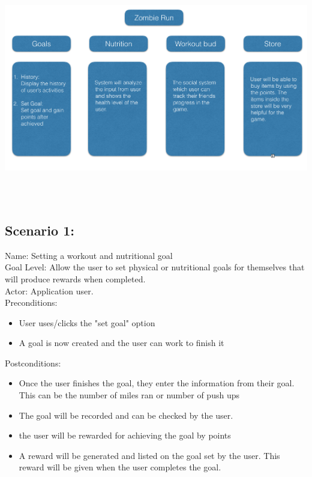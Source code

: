 \documentclass[a4paper]{article}
\begin{document}
\graphicspath{ {files/graph.png} }
\includegraphics[width = 15cm, height=10cm]{graph}

\subsection{Scenario 1:}
Name: Setting a workout and nutritional goal\newline
\\
Goal Level: Allow the user to set physical  or nutritional goals for themselves that will produce rewards when completed.\newline
\\
Actor: Application user.\newline
\\
Preconditions:
\begin{itemize}
\item User uses/clicks the "set goal" option
\item A goal is now created and the user can work to finish it
\end{itemize}
Postconditions:
\begin{itemize}
\item Once the user finishes the goal, they enter the information from their goal. This can be the number of miles ran or number of push ups
\item The goal will be recorded and can be checked by the user.
\item the user will be rewarded for achieving the goal by points
\item A reward will be generated and listed on the goal set by the user.  This reward will be given when the user completes the goal.
\end{itemize}
\end{document}

